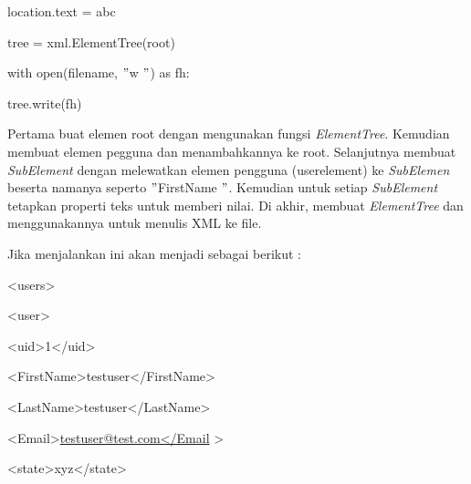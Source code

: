 \documentclass{wileySix}
\begin{document}
\begin{myEnumerate}
{\noindent 
{\fontsize{10pt}{10pt}\selectfont location.text = abc} \par
\vspace{10pt}
\noindent 
{\fontsize{10pt}{10pt}\selectfont tree = xml.ElementTree(root)} \par
\noindent 
{\fontsize{10pt}{10pt}\selectfont with open(filename,  $ " $w $ " $) as fh:} \par
\noindent 
{\fontsize{10pt}{10pt}\selectfont tree.write(fh)} \par
\vspace{10pt}
\noindent 
\hspace*{0.5in} Pertama buat elemen root dengan mengunakan fungsi \textit{ElementTree}. Kemudian membuat elemen pegguna dan menambahkannya ke root. Selanjutnya membuat \textit{SubElement }dengan melewatkan elemen pengguna (userelement) ke \textit{SubElemen} beserta namanya seperto  $ " $FirstName $ " $. Kemudian untuk setiap \textit{SubElement} tetapkan properti teks untuk memberi nilai. Di akhir, membuat \textit{ElementTree} dan menggunakannya untuk menulis XML ke file. \par
\noindent 
\hspace*{0.5in} Jika menjalankan ini akan menjadi sebagai berikut : \par
\noindent 
{\fontsize{10pt}{10pt}\selectfont <users>} \par
\noindent 
{\fontsize{10pt}{10pt}\selectfont  \hspace*{0.5in} <user>} \par
\noindent 
{\fontsize{10pt}{10pt}\selectfont  \hspace*{0.5in}  \hspace*{0.5in} <uid>1</uid>} \par
\noindent 
{\fontsize{10pt}{10pt}\selectfont  \hspace*{0.5in}  \hspace*{0.5in} <FirstName>testuser</FirstName>} \par
\noindent 
{\fontsize{10pt}{10pt}\selectfont  \hspace*{0.5in}  \hspace*{0.5in} <LastName>testuser</LastName>} \par
\noindent 
{\fontsize{10pt}{10pt}\selectfont  \hspace*{0.5in}  \hspace*{0.5in} <Email>\href{mailto:testuser@test.com $  \%  $3c/Email}{testuser@test.com</Email}
	>} \par
\noindent 
{\fontsize{10pt}{10pt}\selectfont  \hspace*{0.5in}  \hspace*{0.5in} <state>xyz</state>} \par
}
\end{myEnumerate}
\end{document}
